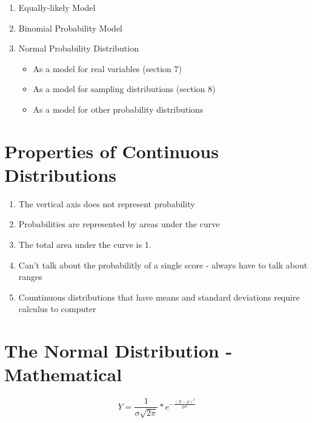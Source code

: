 \documentclass[12pt]{article}
\begin{document}
\begin{enumerate}
\def\labelenumi{\arabic{enumi}.}
\itemsep1pt\parskip0pt
\item
  Equally-likely Model
\item
  Binomial Probability Model
\item
  Normal Probability Distribution

  \begin{itemize}
  \itemsep1pt\parskip0pt
  \item
    As a model for real variables (section 7)
  \item
    As a model for sampling distributions (section 8)
  \item
    As a model for other probability distributions
  \end{itemize}
\end{enumerate}

\section{Properties of Continuous
Distributions}\label{properties-of-continuous-distributions}

\begin{enumerate}
\def\labelenumi{\arabic{enumi}.}
\itemsep1pt\parskip0pt
\item
  The vertical axis does not represent probability
\item
  Probabilities are represented by areas under the curve
\item
  The total area under the curve is 1.
\item
  Can't talk about the probabilitly of a single score - always have to
  talk about ranges
\item
  Countinuous distributions that have means and standard deviations
  require calculus to computer
\end{enumerate}

\section{The Normal Distribution -
Mathematical}\label{the-normal-distribution---mathematical}

\[ Y = \frac{1}{\sigma \sqrt{2 \pi}}* e^{-\frac{(X - \mu)^2}{2 \sigma^2}} \]
\end{document}
